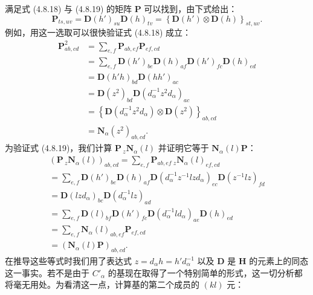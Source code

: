 满足式 (4.8.18) 与 (4.8.19) 的矩阵 $\mathbf{P}$ 可以找到，由下式给出：
\begin{equation*}
\mathbf{P}_{ts, uv} = \mathbf{D}(h')_{su}\mathbf{D}(h)_{tv} = \left\{\mathbf{D}(h') \otimes \mathbf{D}(h)\right\}_{st, uv}.
\tag{4.8.22}
\end{equation*}
例如，用这一选取可以很快验证式 (4.8.18) 成立：
\begin{equation*}
\begin{array}{rl}
\mathbf{P}^{2}_{ab, cd} &= \sum_{e, f}\mathbf{P}_{ab, ef}\mathbf{P}_{ef, cd}\\
&= \sum_{e, f}\mathbf{D}(h')_{be}\mathbf{D}(h)_{af}\mathbf{D}(h')_{fc}\mathbf{D}(h)_{ed}\\
&= \mathbf{D}(h'h)_{bd}\mathbf{D}(hh')_{ac}\\
&= \mathbf{D}(z^{2})_{bd}\mathbf{D}(d^{-1}_{\alpha}z^{2}d_{\alpha})_{ac}\\
&= \left\{\mathbf{D}(d^{-1}_{\alpha}z^{2}d_{\alpha}) \otimes \mathbf{D}(z^{2})\right\}_{ab, cd}\\
&= \mathbf{N}_{\alpha}(z^{2})_{ab, cd}.
\end{array}
\end{equation*}
为验证式 (4.8.19)，我们计算 $\mathbf{P}\,{}_{z}\mathbf{N}_{\alpha}(l)$ 并证明它等于 $\mathbf{N}_{\alpha}(l)\mathbf{P}$：
\begin{equation*}
\begin{array}{l}
\left(\mathbf{P}\,{}_{z}\mathbf{N}_{\alpha}(l)\right)_{ab, cd} = \sum_{e, f}\mathbf{P}_{ab, ef}\,{}_{z}\mathbf{N}_{\alpha}(l)_{ef, cd}\\
= \sum_{e, f}\mathbf{D}(h')_{be}\mathbf{D}(h)_{af}\mathbf{D}(d^{-1}_{\alpha}z^{-1}lzd_{\alpha})_{ec}\mathbf{D}(z^{-1}lz)_{fd}\\
= \mathbf{D}(lzd_{\alpha})_{bc}\mathbf{D}(d^{-1}_{\alpha}lz)_{ad}\\
= \sum_{e, f}\mathbf{D}(l)_{bf}\mathbf{D}(h')_{fc}\mathbf{D}(d^{-1}_{\alpha}ld_{\alpha})_{ae}\mathbf{D}(h)_{ed}\\
= \sum_{e, f}\mathbf{N}_{\alpha}(l)_{ab, ef}\mathbf{P}_{ef, cd}\\
= \left(\mathbf{N}_{\alpha}(l)\mathbf{P}\right)_{ab, cd}.
\end{array}
\tag{4.8.23}
\end{equation*}
在推导这些等式时我们用了表达式 $z = d_{\alpha}h = h'd^{-1}_{\alpha}$ 以及 $\mathbf{D}$ 是 $\mathbf{H}$ 的元素上的同态这一事实。若不是由于 $C'_{\alpha}$ 的基现在取得了一个特别简单的形式，这一切分析都将毫无用处。为看清这一点，计算基的第二个成员的 $(kl)$ 元：
